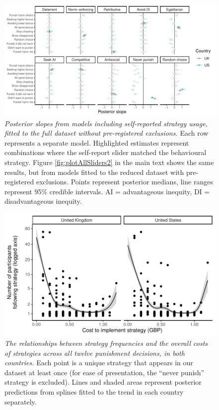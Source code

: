 \documentclass[
  english,
  man, donotrepeattitle,floatsintext]{apa6}
\begin{document}
\newpage










\begin{figure}
\centering
\includegraphics{manuscript_files/figure-latex/plotAllSliders1-1.pdf}
\caption{\label{fig:plotAllSliders1}\emph{Posterior slopes from models including
self-reported strategy usage, fitted to the full dataset without pre-registered
exclusions.} Each row represents a separate model. Highlighted estimates
represent combinations where the self-report slider matched the behavioural
strategy. Figure \ref{fig:plotAllSliders2} in the main text shows the same
results, but from models fitted to the reduced dataset with pre-registered
exclusions. Points represent posterior medians, line ranges represent 95\%
credible intervals. AI = advantageous inequity, DI = disadvantageous inequity.}
\end{figure}

\newpage








\begin{figure}
\centering
\includegraphics{manuscript_files/figure-latex/plotSpline-1.pdf}
\caption{\label{fig:plotSpline}\emph{The relationships between strategy frequencies and the
overall costs of strategies across all twelve punishment decisions, in both
countries.} Each point is a unique strategy that appears in our dataset at
least once (for ease of presentation, the ``never punish'' strategy is excluded).
Lines and shaded areas represent posterior predictions from splines fitted to
the trend in each country separately.}
\end{figure}
\end{document}
